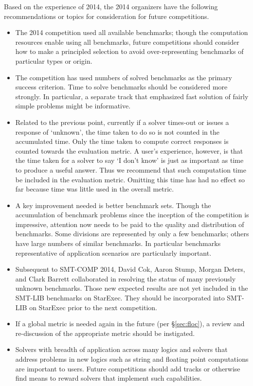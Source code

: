 \documentclass[twoside,11pt]{article}
\begin{document}
Based on the experience of 2014, the 2014 organizers have the following recommendations or topics for consideration for future competitions.
\begin{itemize}
\item The 2014 competition used all available benchmarks; though the computation resources enable using all benchmarks, future competitions should consider how to make a principled selection to avoid over-representing benchmarks of particular types or origin.
\item The competition has used numbers of solved benchmarks as the primary success criterion. Time to solve benchmarks should be considered more strongly. In particular, a separate track that emphasized fast solution of fairly simple problems might be informative.
\item Related to the previous point, currently if a solver times-out or issues a response of `unknown', the time taken to do so is not counted in the accumulated time. Only the time taken to compute correct responses is counted towards the evaluation metric.
A user's experience, however, is that the time taken for a solver to say `I don't know' is just as important as time to produce a useful answer. Thus we recommend that such 
computation time be included in the evaluation metric. Omitting this time has had no effect so far because time was little used in the overall metric.
\item A key improvement needed is better benchmark sets. Though the accumulation of benchmark problems since the inception of the competition is impressive, attention now needs to be paid to the quality and distribution of benchmarks. Some divisions are represented by only a few benchmarks; others have large numbers of similar benchmarks.
In particular benchmarks representative of application scenarios are particularly important.
\item Subsequent to SMT-COMP 2014, David Cok, Aaron Stump, Morgan Deters, and Clark Barrett collaborated in resolving the status of many previously unknown benchmarks. Those new expected results are not yet included in the SMT-LIB benchmarks on StarExec. They should be incorporated into SMT-LIB on StarExec prior to the next competition.
\item If a global metric is needed again in the future (per \S\ref{sec:floc}), a review and re-discussion of the appropriate metric should be instigated.
\item Solvers with breadth of application across many logics and solvers that address problems in new logics such as string and floating point computations are important to users. Future competitions should add tracks or otherwise find means to reward solvers that implement such capabilities.

\end{itemize}
\end{document}
